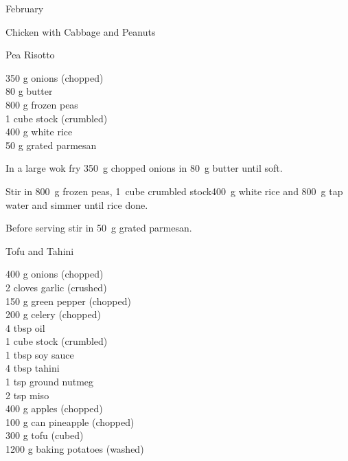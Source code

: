 \begin{menu}{February}
\begin{recipe}{2}{Chicken with Cabbage and Peanuts}
\begin{instructions}
    \end{instructions}
    \end{recipe}%
  
    \begin{recipe}{2}{Pea Risotto}%
		\begin{ingredients}
		350 g onions (chopped) \\
	80 g butter  \\
	800 g frozen peas  \\
	1 cube stock (crumbled) \\
	400 g white rice  \\
	50 g grated parmesan  \\
	
		\end{ingredients}
	
    \begin{instructions}
    \item 
        In a large wok fry
        350~g chopped onions
        in
        80~g  butter
        until soft.
      \item 
        Stir in
        800~g  frozen peas,
        1~cube crumbled stock400~g  white rice
        and
        800~g  tap water
        and simmer until rice done.
      \item 
        Before serving stir in
        50~g  grated parmesan.
      
    \end{instructions}
    \end{recipe}%
  
    \begin{recipe}{2}{Tofu and Tahini}%
		\begin{ingredients}
		400 g onions (chopped) \\
	2 cloves garlic (crushed) \\
	150 g green pepper (chopped) \\
	200 g celery (chopped) \\
	4 tbsp oil  \\
	1 cube stock (crumbled) \\
	1 tbsp soy sauce  \\
	4 tbsp tahini  \\
	1 tsp ground nutmeg  \\
	2 tsp miso  \\
	400 g apples (chopped) \\
	100 g can pineapple (chopped) \\
	300 g tofu (cubed) \\
	1200 g baking potatoes (washed) \\
	

\end{ingredients}
\end{recipe}
\end{menu}
